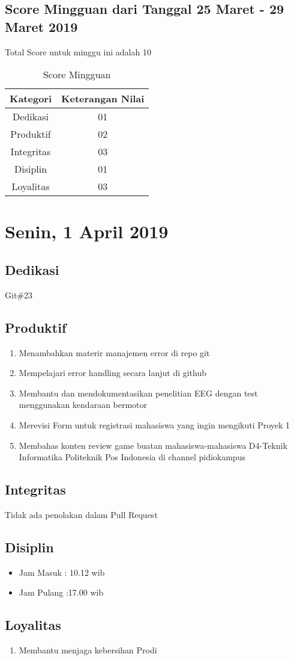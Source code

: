 \subsection{Score Mingguan dari Tanggal 25 Maret - 29 Maret 2019}
Total Score untuk minggu ini adalah 10

\begin{table}[h]
\caption{Score Mingguan}
\centering
\begin{tabular}{|c|c|}
\hline
\textbf{Kategori}&\textbf{Keterangan Nilai}\\
\hline
Dedikasi&01\\
\hline
Produktif&02\\
\hline
Integritas&03\\
\hline
Disiplin&01\\
\hline
Loyalitas&03\\
\hline
\end{tabular}
\label{table:score mingguan}
\end{table}

\section{Senin, 1 April 2019}
\subsection{Dedikasi}
Git\#23
\subsection{Produktif}
\begin{enumerate}
\item Menambahkan materir manajemen error di repo git
\item Mempelajari error handling secara lanjut di github
\item Membantu dan mendokumentasikan penelitian EEG dengan test menggunakan kendaraan bermotor
\item Merevisi Form untuk registrasi mahasiswa yang ingin mengikuti Proyek 1
\item Membahas konten review game buatan mahasiswa-mahasiswa D4-Teknik Informatika Politeknik Pos Indonesia di channel pidiokampus
\end{enumerate}
\subsection{Integritas}
Tidak ada penolakan dalam Pull Request
\subsection{Disiplin}
\begin{itemize}
\item Jam Masuk : 10.12 wib
\item Jam Pulang :17.00 wib
\end{itemize}
\subsection{Loyalitas}
\begin{enumerate}
\item Membantu menjaga kebersihan Prodi
\end{enumerate}